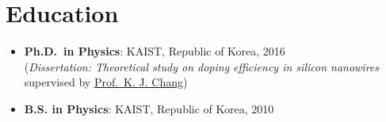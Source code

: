 \section{Education}\label{education}

\begin{itemize}
\tightlist
\item
  \textbf{Ph.D.~in Physics}: KAIST, Republic of Korea, 2016\\
  (\emph{Dissertation: Theoretical study on doping efficiency in silicon
  nanowires} supervised by \href{http://taehae.kaist.ac.kr}{Prof.~K. J.
  Chang})
\item
  \textbf{B.S. in Physics}: KAIST, Republic of Korea, 2010
\end{itemize}
